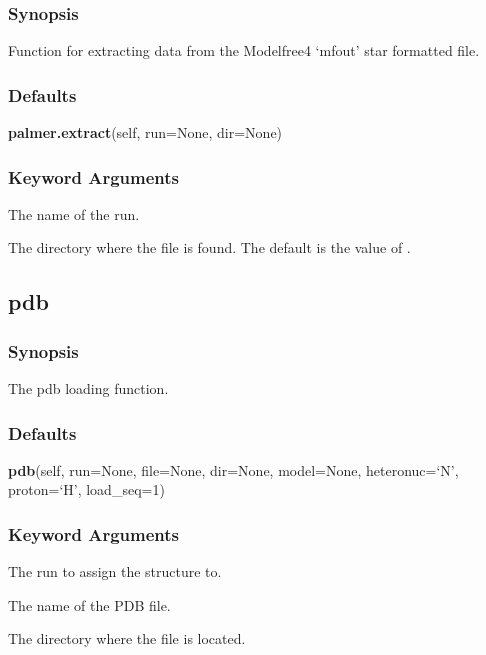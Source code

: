 \subsubsection{Synopsis}

Function for extracting data from the Modelfree4 `mfout' star formatted file.

\subsubsection{Defaults}

\textsf{\textbf{palmer.extract}(self, run=None, dir=None)}


\subsubsection{Keyword Arguments}


  The name of the run.

  The directory where the file 
 is found.  The default is the value of 
.


\newpage

\subsection{pdb}


\subsubsection{Synopsis}

The pdb loading function.

\subsubsection{Defaults}

\textsf{\textbf{pdb}(self, run=None, file=None, dir=None, model=None, heteronuc=`N', proton=`H', load\_seq=1)}


\subsubsection{Keyword Arguments}


  The run to assign the structure to.

  The name of the PDB  file.

  The directory where the file is located.

